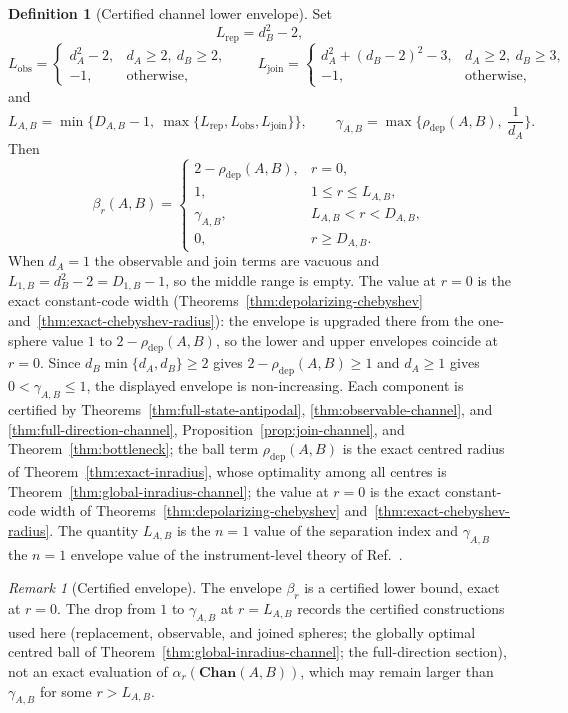 \documentclass[11pt,a4paper]{article}
\theoremstyle{definition}
\newtheorem{definition}{Definition}[section]
\theoremstyle{plain}
\theoremstyle{remark}
\newtheorem{remark}[theorem]{Remark}
\newcommand{\Chan}{\mathbf{Chan}}
\newcommand{\rhodep}{\rho_{\mathrm{dep}}}
\begin{document}
\begin{definition}[Certified channel lower envelope]
\label{def:channel-envelope}
Set
\[
L_{\mathrm{rep}}=d_B^2-2,
\]
\[
L_{\mathrm{obs}}=
\begin{cases}
d_A^2-2,&d_A\ge2,\ d_B\ge2,\\
-1,&\text{otherwise},
\end{cases}
\qquad
L_{\mathrm{join}}=
\begin{cases}
d_A^2+(d_B-2)^2-3,&d_A\ge2,\ d_B\ge3,\\
-1,&\text{otherwise},
\end{cases}
\]
and
\[
L_{A,B}
=\min\Big\{D_{A,B}-1,\ \max\{L_{\mathrm{rep}},L_{\mathrm{obs}},L_{\mathrm{join}}\}\Big\},
\qquad
\gamma_{A,B}
=\max\Big\{\rhodep(A,B),\ \frac1{d_A}\Big\}.
\]
Then
\[
\beta_r(A,B)=
\begin{cases}
2-\rhodep(A,B),&r=0,\\[2pt]
1,&1\le r\le L_{A,B},\\[2pt]
\gamma_{A,B},&L_{A,B}<r<D_{A,B},\\[2pt]
0,&r\ge D_{A,B}.
\end{cases}
\]
When $d_A=1$ the observable and join terms are vacuous and
$L_{1,B}=d_B^2-2=D_{1,B}-1$, so the middle range is empty. The value at
$r=0$ is the exact constant-code width
(Theorems~\ref{thm:depolarizing-chebyshev} and~\ref{thm:exact-chebyshev-radius}):
the envelope is upgraded there from the one-sphere value $1$ to
$2-\rhodep(A,B)$, so the lower and upper envelopes coincide at $r=0$.
Since $d_B\min\{d_A,d_B\}\ge2$ gives $2-\rhodep(A,B)\ge1$ and $d_A\ge1$ gives
$0<\gamma_{A,B}\le1$, the displayed envelope is non-increasing. Each component is certified by
Theorems~\ref{thm:full-state-antipodal}, \ref{thm:observable-channel}, and
\ref{thm:full-direction-channel}, Proposition~\ref{prop:join-channel}, and
Theorem~\ref{thm:bottleneck}; the ball term $\rhodep(A,B)$ is the exact
centred radius of Theorem~\ref{thm:exact-inradius}, whose optimality among
all centres is Theorem~\ref{thm:global-inradius-channel}; the value at
$r=0$ is the exact constant-code width of
Theorems~\ref{thm:depolarizing-chebyshev} and~\ref{thm:exact-chebyshev-radius}. The
quantity $L_{A,B}$ is the $n=1$ value of the separation index and
$\gamma_{A,B}$ the $n=1$ envelope value of the instrument-level theory
of Ref.~\cite{CompanionInstruments}.
\end{definition}

\begin{remark}[Certified envelope]
The envelope $\beta_r$ is a certified lower bound, exact at $r=0$.
The drop from $1$ to $\gamma_{A,B}$ at $r=L_{A,B}$ records the certified constructions used here (replacement, observable, and joined spheres; the globally optimal centred ball of Theorem~\ref{thm:global-inradius-channel}; the full-direction section), not an exact evaluation of $\alpha_r(\Chan(A,B))$, which may remain larger than $\gamma_{A,B}$ for some $r>L_{A,B}$.
\end{remark}
\end{document}
